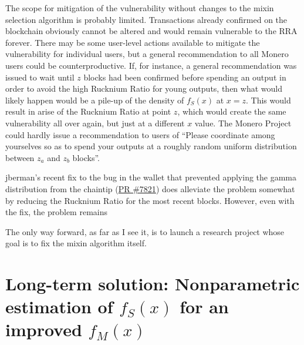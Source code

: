 \documentclass[english]{paper}
\begin{document}
The scope for mitigation of the vulnerability without changes to the
mixin selection algorithm is probably limited. Transactions already
confirmed on the blockchain obviously cannot be altered and would
remain vulnerable to the RRA forever. There may be some user-level
actions available to mitigate the vulnerability for individual users,
but a general recommendation to all Monero users could be counterproductive.
If, for instance, a general recommendation was issued to wait until
$z$ blocks had been confirmed before spending an output in order
to avoid the high Rucknium Ratio for young outputs, then what would
likely happen would be a pile-up of the density of $f_{S}(x)$ at
$x=z$. This would result in arise of the Rucknium Ratio at point
$z$, which would create the same vulnerability all over again, but
just at a different $x$ value. The Monero Project could hardly issue
a recommendation to users of ``Please coordinate among yourselves
so as to spend your outputs at a roughly random uniform distribution
between $z_{a}$ and $z_{b}$ blocks''.

jberman's recent fix to the bug in the wallet that prevented applying
the gamma distribution from the chaintip (\href{https://github.com/monero-project/monero/pull/7821}{PR \#7821})
does alleviate the problem somewhat by reducing the Rucknium Ratio
for the most recent blocks. However, even with the fix, the problem
remains

The only way forward, as far as I see it, is to launch a research
project whose goal is to fix the mixin algorithm itself. \\

\noindent{}

\section{Long-term solution: Nonparametric estimation of $f_{S}(x)$ for an
improved $f_{M}(x)$}
\end{document}

